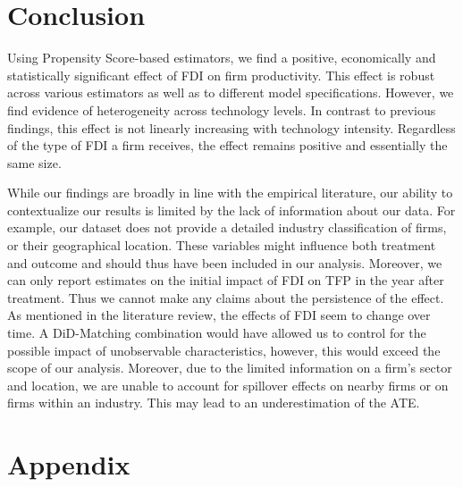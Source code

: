 \documentclass[a4paper,11pt]{scrartcl}
\newcommand{\sectionnumbering}[1]{%
  \setcounter{section}{0}%
   \renewcommand{\thesection}{\csname #1\endcsname{section}}}
\begin{document}
\section{Conclusion}

Using Propensity Score-based estimators, we find a positive, economically and statistically significant effect of FDI on firm productivity. This effect is robust across various estimators as well as to different model specifications. However, we find evidence of heterogeneity across technology levels. 
In contrast to previous findings, this effect is not linearly increasing with technology intensity. %
Regardless of the type of FDI a firm receives, the effect remains positive and essentially the same size.

While our findings are broadly in line with the empirical literature, our ability to contextualize our results is limited by the lack of information about our data. For example, our dataset does not provide a detailed industry classification of firms, or their geographical location. These variables might influence both treatment and outcome and should thus have been included in our analysis. Moreover, we can only report estimates on the initial impact of FDI on TFP in the year after treatment. Thus we cannot make any claims about the persistence of the effect. As mentioned in the literature review, the effects of FDI seem to change over time. A DiD-Matching combination would have allowed us to control for the possible impact of unobservable characteristics, however, this would exceed the scope of our analysis. Moreover, due to the limited information on a firm's sector and location, we are unable to account for spillover effects on nearby firms or on firms within an industry. This may lead to an underestimation of the ATE. 


\newpage

 
\newpage


\sectionnumbering{Roman}
\setcounter{page}{3} %

\appendix
\section{Appendix}
\end{document}
